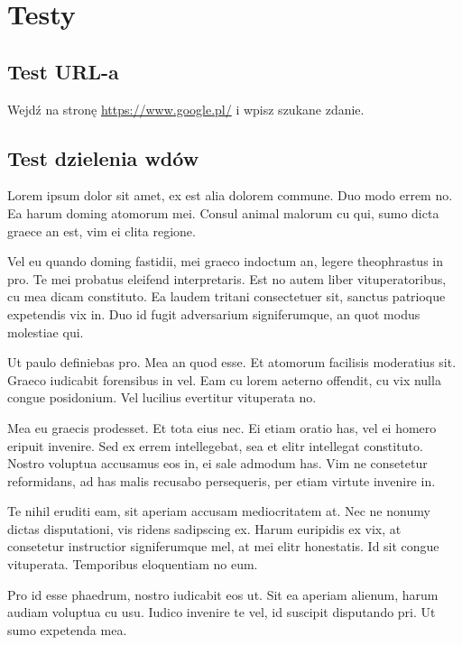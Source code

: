 \chapter{Testy}


\section{Test URL-a}

Wejdź na stronę \url{https://www.google.pl/} i wpisz szukane zdanie.

\clearpage

\section{Test dzielenia wdów}

Lorem ipsum dolor sit amet, ex est alia dolorem commune. Duo modo errem no. Ea harum doming atomorum mei. Consul animal malorum cu qui, sumo dicta graece an est, vim ei clita regione.

Vel eu quando doming fastidii, mei graeco indoctum an, legere theophrastus in pro. Te mei probatus eleifend interpretaris. Est no autem liber vituperatoribus, cu mea dicam constituto. Ea laudem tritani consectetuer sit, sanctus patrioque expetendis vix in. Duo id fugit adversarium signiferumque, an quot modus molestiae qui.

Ut paulo definiebas pro. Mea an quod esse. Et atomorum facilisis moderatius sit. Graeco iudicabit forensibus in vel. Eam cu lorem aeterno offendit, cu vix nulla congue posidonium. Vel lucilius evertitur vituperata no.

Mea eu graecis prodesset. Et tota eius nec. Ei etiam oratio has, vel ei homero eripuit invenire. Sed ex errem intellegebat, sea et elitr intellegat constituto. Nostro voluptua accusamus eos in, ei sale admodum has. Vim ne consetetur reformidans, ad has malis recusabo persequeris, per etiam virtute invenire in.

Te nihil eruditi eam, sit aperiam accusam mediocritatem at. Nec ne nonumy dictas disputationi, vis ridens sadipscing ex. Harum euripidis ex vix, at consetetur instructior signiferumque mel, at mei elitr honestatis. Id sit congue vituperata. Temporibus eloquentiam no eum.

Pro id esse phaedrum, nostro iudicabit eos ut. Sit ea aperiam alienum, harum audiam voluptua cu usu. Iudico invenire te vel, id suscipit disputando pri. Ut sumo expetenda mea.

